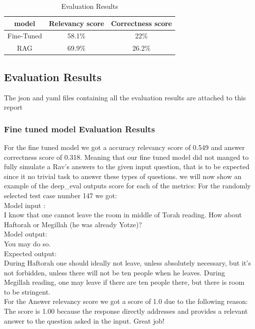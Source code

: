 \documentclass[11pt]{article}
\begin{document}
\begin{table}[htbp]
    \centering
    \caption{Evaluation Results}
    \label{tab:example}
    \begin{tabular}{ccc}
        \toprule
        model & Relevancy score & Correctness score   \\
        \midrule
        
        Fine-Tuned & 58.1\% & 22\%  \\
        RAG & 69.9\% & 26.2\% \\
        \bottomrule
    \end{tabular}
\end{table}

\subsection{Evaluation Results}
The json and yaml files containing all the evaluation results are attached to this report
\subsubsection{Fine tuned model Evaluation Results}
For the fine tuned model we got a accuracy relevancy score of 0.549 and answer correctness score of 0.318.
Meaning that our fine tuned model did not manged to fully simulate a Rav's answers to the given input question, that is to be expected since it no trivial task to answer these types of questions.
we will now show an example of the deep\_eval outputs score for each of the metrics:
For the randomly selected test case number 147 we got:\\
Model input :\\
 I know that one cannot leave the room in middle of Torah reading. How about Haftorah or Megillah (he was already Yotze)?\\
Model output:\\

You may do so. \\

Expected output: \\

During Haftorah one should ideally not leave, unless absolutely necessary, but it’s not forbidden, unless there will not be ten people when he leaves.
During Megillah reading, one may leave if there are ten people there, but there is room to be stringent. \\

For the Answer relevancy score we got a score of 1.0 due to the following reason: \\
The score is 1.00 because the response directly addresses and provides a relevant answer to the question asked in the input. Great job!\\
\end{document}
